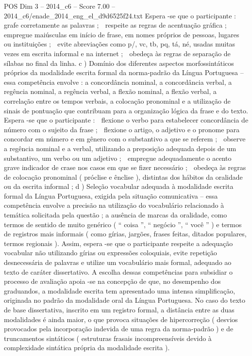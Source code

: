 \begin{textsample}{POS Dim 3 – 2014\_c6 – Score 7.00 – 2014\_c6/enade\_2014\_eng\_el\_d9d6525f24.txt}
Espera -se que o participante :  grafe corretamente as palavras ;  respeite as regras de acentuação gráfica ;  empregue maiúsculas em início de frase, em nomes próprios de pessoas, lugares ou instituições ;  evite abreviações como p/, vc, tb, pq, tá, né, usadas muitas vezes em escrita informal e na internet ;  obedeça às regras de separação de sílabas no final da linha. c ) Domínio dos diferentes aspectos morfossintáticos próprios da modalidade escrita formal da norma-padrão da Língua Portuguesa – essa competência envolve : a concordância nominal, a concordância verbal, a regência nominal, a regência verbal, a flexão nominal, a flexão verbal, a correlação entre os tempos verbais, a colocação pronominal e a utilização de sinais de pontuação que contribuam para a organização lógica da frase e do texto.
Espera -se que o participante :  flexione o verbo para estabelecer concordância de número com o sujeito da frase ;  flexione o artigo, o adjetivo e o pronome para concordar em número e em gênero com o substantivo a que se referem ;  observe a regência nominal e a verbal, utilizando a preposição adequada depois de um substantivo, um verbo ou um adjetivo ;  empregue adequadamente o acento grave indicador de crase nos casos em que se fizer necessário ;  obedeça às regras de colocação pronominal ( próclise e ênclise ), distintas dos hábitos da oralidade ou da escrita informal ; d ) Seleção vocabular adequada à modalidade escrita formal da Língua Portuguesa, exigida pela situação comunicativa – essa competência envolve a precisão na utilização do vocabulário relacionado à temática solicitada pela questão ; a ausência de marcas da oralidade, como termos de sentido de muito genérico ( “ coisa ”, “ negócio ”, “ você ” ) e termos de registros mais informais ( como gírias, jargões, frases feitas, ditados populares, termos regionais ).
Assim, espera -se que o participante respeite a adequação vocabular não utilizando gírias ou expressões coloquiais, evite repetição desnecessária de palavras e utilize um vocabulário mais formal, adequado ao texto de caráter dissertativo.
A escolha dessas competências para subsidiar o processo de avaliação apoia -se na concepção de que, no desempenho dos graduandos, a modalidade escrita tem apresentado uma intensa simplificação, originada no padrão da modalidade oral da Língua Portuguesa.
No caso do texto de base dissertativa, inscrito em um registro formal, a distância entre as duas modalidades é ainda maior, o que provoca situações de hipercorreção ( desvios provocados pela incorporação indevida de uma regra da norma-padrão ) e de truncamentos sintáticos ( estruturas frasais incompreensíveis devido à complexidade sintática própria da modalidade escrita ).

\end{textsample}
